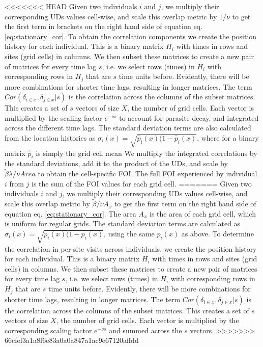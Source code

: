\documentclass[letterpaper]{article}
\begin{document}
<<<<<<< HEAD
Given two individuals $i$ and $j$, we multiply their corresponding UDs values cell-wise, and scale this overlap metric by $1/\nu$ to get the first term in brackets on the right hand side of equation eq. \ref{eq:stationary_cor}. %
To obtain the correlation components we create the position history for each individual. This is a binary matrix $H_i$ with times in rows and sites (grid cells) in columns. We then subset these matrices to create a new pair of matrices for every time lag $s$, i.e. we select rows (times) in $H_i$ with corresponding rows in $H_j$ that are $s$ time units before. Evidently, there will be more combinations for shorter time lags, resulting in longer matrices. 
The term $Cor(\delta_{i \in x}, \delta_{j \in x} | s)$ is the correlation across the columns of the subset matrices. This creates a set of $s$ vectors of size $X$, the number of grid cells. Each vector is multiplied by the scaling factor $e^{-\nu s}$ to account for parasite decay, and integrated across the different time lags. 
The standard deviation terms are also calculated from the location histories as $\sigma_i(x)=\sqrt{\hat p_i(x)(1-\hat p_i(x)}$, where for a binary matrix $\hat p_i$ is simply the grid cell mean %
We multiply the integrated correlations by the standard deviations, add it to the product of the UDs, and scale by $\tilde\beta\lambda/\nu Area$ to obtain the cell-specific FOI. The full FOI experienced by individual $i$ from $j$ is the sum of the FOI values for each grid cell. 
=======
Given two individuals $i$ and $j$, we multiply their corresponding UDs values cell-wise, and scale this overlap metric by $\tilde\beta/\nu A_x$ to get the first term on the right hand side of equation eq. \ref{eq:stationary_cor}. The area $A_x$ is the area of each grid cell, which is uniform for regular grids. 
The standard deviation terms are calculated as $\sigma_i(x)=\sqrt{p_i(x)(1-p_i(x)}$, using the same $p_i(x)$ as above. %
To determine the correlation in per-site visits across individuals, we create the position history for each individual. This is a binary matrix $H_i$ with times in rows and sites (grid cells) in columns. We then subset these matrices to create a new pair of matrices for every time lag $s$, i.e. we select rows (times) in $H_i$ with corresponding rows in $H_j$ that are $s$ time units before. Evidently, there will be more combinations for shorter time lags, resulting in longer matrices. The term $Cor(\delta_{i \in x}, \delta_{j \in x} | s)$ is the correlation across the columns of the subset matrices. This creates a set of $s$ vectors of size $X$, the number of grid cells. Each vector is multiplied by the corresponding scaling factor $e^{-\nu s}$ and summed across the $s$ vectors. %
>>>>>>> 66cfef3a1a8f6e83a0a0a847a1ac9e67120affdd
\end{document}
